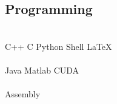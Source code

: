 \documentclass[letterpaper]{deedy-resume} %
\begin{document}
\begin{minipage}[t]{0.32\textwidth}
\subsection{Programming}

 \\
C++ \textbullet{} C \textbullet{} Python \textbullet{} Shell \textbullet{} \LaTeX\ \\
 \\
Java \textbullet{} Matlab \textbullet{} CUDA \\
 \\
Assembly

\sectionspace %


\end{minipage} %
\hfill
%
%
\end{document}
